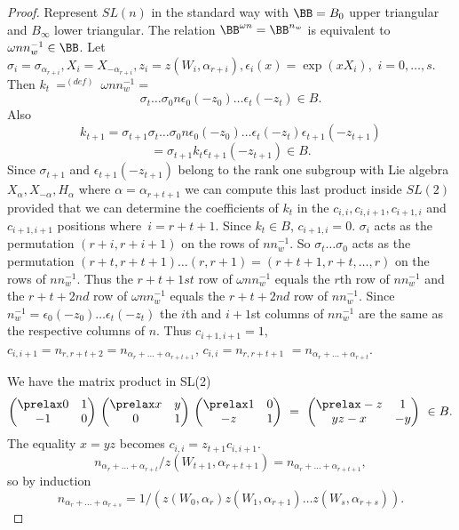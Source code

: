 \documentclass{memo-l}
\theoremstyle{definition}
\theoremstyle{remark}
\numberwithin{section}{chapter}
\numberwithin{equation}{chapter}
\begin{document}
\begin{proof}    Represent $SL(n)$ in the standard way with ${\BB} = 
B_{0}$ upper triangular and $B_{{\infty}}$ lower triangular. 
 The relation ${\BB}^{\omega n}  = 
{\BB}^{n_w}$  is equivalent to ${\omega}nn_{w}^{-1} 
\in {\BB}$. 
 Let ${\sigma}_{i} = {\sigma}_{\alpha_{r+i}}, 
X_{i} = X_{-{\alpha}_{r+i}}, z_{i} = z(W_{i},{\alpha}_{r+i}), 
{\epsilon}_{i}(x) = \exp(xX_{i})$,\ $i=0,\ldots ,s$. 
 Then $k_{t}\ {\mathrel{\mathop =^{(def)}}}\ {\omega}nn_{w}^{-1} =$ 
$$
{\sigma}_{t}\ldots {\sigma}_{0}n{\epsilon}_{0}(-z_{0})\ldots {\epsilon}_{t}(-z_{t}) 
\in B .
$$
Also
$$
k_{t+1} = {\sigma}_{t+1}{\sigma}_{t}\ldots {\sigma}_{0}n{\epsilon}_{0}(-z_{0})
\ldots {\epsilon}_{t}(-z_{t}){\epsilon}_{t+1}(-z_{t+1})
$$
$$
= {\sigma}_{t+1}k_{t}{\epsilon}_{t+1}(-z_{t+1}) \in B .
$$
Since ${\sigma}_{t+1}$ and ${\epsilon}_{t+1}(-z_{t+1})$ belong to the rank 
one subgroup with Lie algebra $X_{{\alpha}}, X_{-{\alpha}}, H_{{\alpha}}$ 
where ${\alpha} = {\alpha}_{r+t+1}$  we can compute this last 
product inside $SL(2)$ provided that we can determine the coefficients of 
$k_{t}$ in the $c_{i,i}, c_{i,i+1}, c_{i+1,i}$ and $c_{i+1,i+1}$ 
positions where\ $i = r+t+1$. 	 Since $k_{t} \in B$,
$c_{i+1,i} = 0$. 
 ${\sigma}_{i}$ acts as the permutation $(r+i,r+i+1)$ on the rows of 
$nn_{w}^{-1}$. 
 So ${\sigma}_{t}\ldots {\sigma}_{0}$ acts as the permutation 
$(r+t,r+t+1)\ldots (r,r+1) = (r+t+1,r+t,\ldots ,r)$ on the rows of $nn_{w}^{-1}$. 
 Thus the $r+t+1st$ row of ${\omega}nn_{w}^{-1}$ equals the $r$th row of 
$nn_{w}^{-1}$ and the $r+t+2nd$ row of ${\omega}nn_{w}^{-1}$ equals the 
$r+t+2nd$ row of $nn_{w}^{-1}$. 
 Since $n_{w}^{-1} = {\epsilon}_{0}(-z_{0})\ldots {\epsilon}_{t}(-z_{t})$ the 
$i$th and $i+1$st columns of $nn_{w}^{-1}$ are the same as the respective 
columns of $n$. 
 Thus $c_{i+1,i+1} = 1$, $c_{i,i+1} = n_{r,r+t+2}  = 
n_{\alpha_r+\ldots +\alpha_{r+t+1}}$, $c_{i,i} = n_{r,r+t+1}$ $ = 
n_{\alpha_r+\ldots + \alpha_{r+t}}.$

   We have the matrix product in SL(2)
$$
{\begin{pmatrix} \prelax  
 0 & 1 \\ -1 & 0 \end{pmatrix}}\ 
{\begin{pmatrix} \prelax  x & y \\ 0 & 1 \end{pmatrix}}\ {\begin{pmatrix} \prelax  
1 & 0 \\ -z & 1 \end{pmatrix}}\ =\ 
{\begin{pmatrix} \prelax  
 -z & 1 \\ yz-x & -y \end{pmatrix}}\
\in B .
$$
The equality $x = yz$ becomes $c_{i,i} = z_{t+1}c_{i,i+1}$.
$$
n_{\alpha_r+\ldots +\alpha_{r+t}}/z(W_{t+1},
{\alpha}_{r+t+1}) = n_{\alpha_r+\ldots +\alpha_{r+t+1}},
$$
so by induction
$$
n_{\alpha_r+\ldots +\alpha_{r+s}}  = 
1/(z(W_{0},{\alpha}_{r})z(W_{1},{\alpha}_{r+1})\ldots z(W_{s},{\alpha}_{r+s})).
$$
\end{proof}
\end{document}
